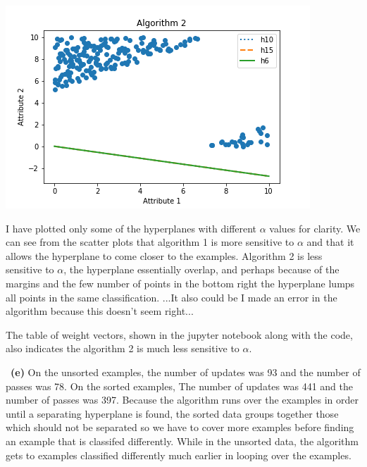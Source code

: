 \documentclass[a4 paper, 15pt]{article}
\numberwithin{equation}{section}
\newcommand{\subproblem}[1]{~\newline\textbf{(#1)}}
\begin{document}
\includegraphics[scale=.5]{algorithm2}
\par
I have plotted only some of the hyperplanes with different $\alpha$ values for clarity. We can see from the scatter plots that algorithm 1 is more sensitive to $\alpha$ and that it allows the hyperplane to come closer to the examples. Algorithm 2 is less sensitive to $\alpha$, the hyperplane essentially overlap, and perhaps because of the margins and the few number of points in the bottom right the hyperplane lumps all points in the same classification. ...It also could be I made an error in the algorithm because this doesn't seem right...
\par
The table of weight vectors, shown in the jupyter notebook along with the code, also indicates the algorithm 2 is much less sensitive to $\alpha$.
\par
\subproblem{e} On the unsorted examples, the number of updates was  93  and the number of passes was  78.  On the sorted examples, The number of updates was  441  and the number of passes was  397.  Because the algorithm runs over the examples in order until a separating hyperplane is found, the sorted data groups together those which should not be separated so we have to cover more examples before finding an example that is classifed differently. While in the unsorted data, the algorithm gets to examples classified differently much earlier in looping over the examples.
\end{document}

